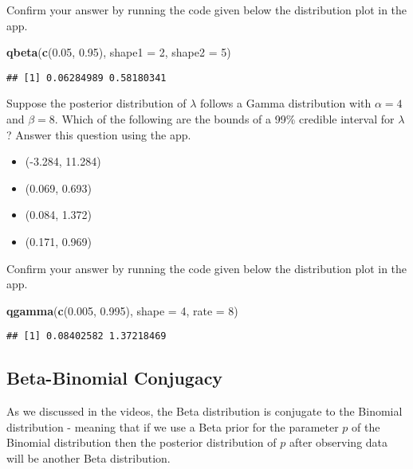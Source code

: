 \documentclass[
]{article}
\newenvironment{Shaded}{\begin{snugshade}}{\end{snugshade}}
\newcommand{\DataTypeTok}[1]{\textcolor[rgb]{0.13,0.29,0.53}{#1}}
\newcommand{\DecValTok}[1]{\textcolor[rgb]{0.00,0.00,0.81}{#1}}
\newcommand{\FloatTok}[1]{\textcolor[rgb]{0.00,0.00,0.81}{#1}}
\newcommand{\KeywordTok}[1]{\textcolor[rgb]{0.13,0.29,0.53}{\textbf{#1}}}
\newcommand{\NormalTok}[1]{#1}
\providecommand{\tightlist}{%
  \setlength{\itemsep}{0pt}\setlength{\parskip}{0pt}}
\begin{document}
Confirm your answer by running the code given below the distribution
plot in the app.

\begin{Shaded}
\begin{Highlighting}[]
\KeywordTok{qbeta}\NormalTok{(}\KeywordTok{c}\NormalTok{(}\FloatTok{0.05}\NormalTok{, }\FloatTok{0.95}\NormalTok{), }\DataTypeTok{shape1 =} \DecValTok{2}\NormalTok{, }\DataTypeTok{shape2 =} \DecValTok{5}\NormalTok{)}
\end{Highlighting}
\end{Shaded}

\begin{verbatim}
## [1] 0.06284989 0.58180341
\end{verbatim}

Suppose the posterior distribution of \(\lambda\) follows a Gamma
distribution with \(\alpha = 4\) and \(\beta = 8\). Which of the
following are the bounds of a 99\% credible interval for \(\lambda\)?
Answer this question using the app.

\begin{itemize}
\tightlist
\item
  (-3.284, 11.284)
\item
  (0.069, 0.693)
\item
  (0.084, 1.372)
\item
  (0.171, 0.969)
\end{itemize}

Confirm your answer by running the code given below the distribution
plot in the app.

\begin{Shaded}
\begin{Highlighting}[]
\KeywordTok{qgamma}\NormalTok{(}\KeywordTok{c}\NormalTok{(}\FloatTok{0.005}\NormalTok{, }\FloatTok{0.995}\NormalTok{), }\DataTypeTok{shape =} \DecValTok{4}\NormalTok{, }\DataTypeTok{rate =} \DecValTok{8}\NormalTok{)}
\end{Highlighting}
\end{Shaded}

\begin{verbatim}
## [1] 0.08402582 1.37218469
\end{verbatim}

\hypertarget{beta-binomial-conjugacy}{%
\subsection{Beta-Binomial Conjugacy}\label{beta-binomial-conjugacy}}

As we discussed in the videos, the Beta distribution is conjugate to the
Binomial distribution - meaning that if we use a Beta prior for the
parameter \(p\) of the Binomial distribution then the posterior
distribution of \(p\) after observing data will be another Beta
distribution.
\end{document}
